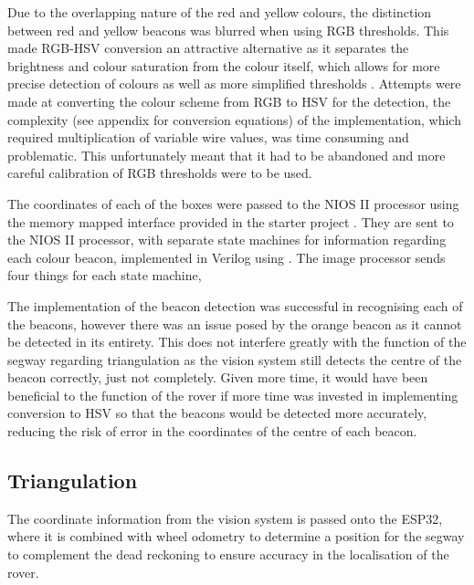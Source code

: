 Due to the overlapping nature of the red and yellow colours, the distinction between red and yellow beacons was blurred when using RGB thresholds. This made RGB-HSV conversion an attractive alternative as it separates the brightness and colour saturation from the colour itself, which allows for more precise detection of colours as well as more simplified thresholds \cite{ref:colorspace}. Attempts were made at converting the colour scheme from RGB to HSV for the detection, the complexity (see appendix for conversion equations) of the implementation, which required multiplication of variable wire values, was time consuming and problematic. This unfortunately meant that it had to be abandoned and more careful calibration of RGB thresholds were to be used.

The coordinates of each of the boxes were passed to the NIOS II processor using the memory mapped interface provided in the starter project \cite{ref:fpga_starter}. They are sent to the NIOS II processor, with separate state machines for information regarding each colour beacon, implemented in Verilog using . The image processor sends four things for each state machine, 

The implementation of the beacon detection was successful in recognising each of the beacons, however there was an issue posed by the orange beacon as it cannot be detected in its entirety. This does not interfere greatly with the function of the segway regarding triangulation as the vision system still detects the centre of the beacon correctly, just not completely. Given more time, it would have been beneficial to the function of the rover if more time was invested in implementing conversion to HSV so that the beacons would be detected more accurately, reducing the risk of error in the coordinates of the centre of each beacon.

\newpage

\subsection{Triangulation}

The coordinate information from the vision system is passed onto the ESP32, where it is combined with wheel odometry to determine a position for the segway to complement the dead reckoning to ensure accuracy in the localisation of the rover.

